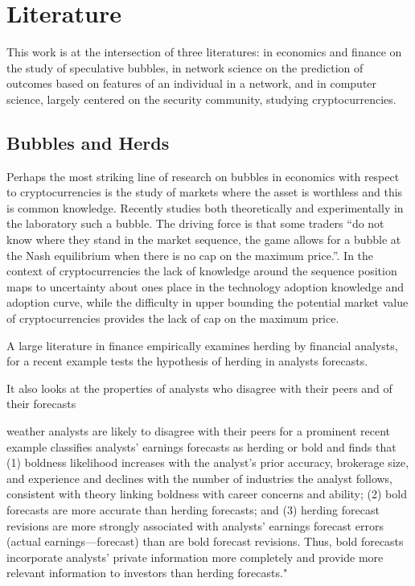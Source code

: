 \section{Literature}

This work is at the intersection of three literatures: in economics and finance on the study of speculative bubbles, in network science on the prediction of outcomes based on features of an individual in a network, and in computer science, largely centered on the security community, studying cryptocurrencies.


\subsection{Bubbles and Herds}

Perhaps the most striking line of research on bubbles in economics with respect to cryptocurrencies is the study of markets where the asset is worthless and this is common knowledge. 
Recently \cite{moinas2013bubble} studies both theoretically and experimentally in the laboratory such a bubble. 
The driving force is that some traders ``do not know where they stand in the market sequence, the game allows for
a bubble at the Nash equilibrium when there is no cap on the maximum price.''.
In the context of cryptocurrencies the lack of knowledge around the sequence position maps to uncertainty about ones place in the technology adoption knowledge and adoption curve, while the difficulty in upper bounding the potential market value of cryptocurrencies provides the lack of cap on the maximum price. 


A large literature in finance empirically examines herding by financial analysts, for a recent example\cite{jegadeesh2009analysts} tests the hypothesis of herding in analysts forecasts. 

It also looks at the properties of analysts who disagree with their peers and of their forecasts

 \cite{clement2005financial} 
weather analysts are likely to disagree with their peers for a prominent recent example classifies analysts' earnings forecasts as herding or bold and finds that (1) boldness likelihood increases with the analyst's prior accuracy, brokerage size, and experience and declines with the number of industries the analyst follows, consistent with theory linking boldness with career concerns and ability; (2) bold forecasts are more accurate than herding forecasts; and (3) herding forecast revisions are more strongly associated with analysts' earnings forecast errors (actual earnings—forecast) than are bold forecast revisions. Thus, bold forecasts incorporate analysts' private information more completely and provide more relevant information to investors than herding forecasts."


